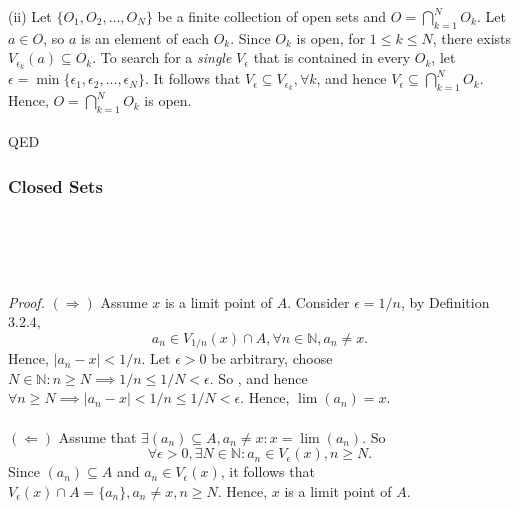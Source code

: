 \documentclass{article}
\begin{document}
            (ii) Let $\{O_1, O_2, \dots, O_N\}$ be a finite collection of open sets and $O = \bigcap_{k=1}^N O_k$. Let $a \in O$, so $a$ is an element of each $O_k$. Since $O_k$ is open, for $1 \leq k \leq N$, there exists $V_{\epsilon_k}(a) \subseteq O_k$. To search for a \textit{single} $V_\epsilon$ that is contained in every $O_k$, let $\epsilon = \min\{\epsilon_1,\epsilon_2,\dots,\epsilon_N\}$. It follows that $V_\epsilon \subseteq V_{\epsilon_k}, \forall k$, and hence $V_\epsilon \subseteq \bigcap_{k=1}^N O_k$. Hence, $O = \bigcap_{k=1}^N O_k$ is open.\\ \\
            QED
            \subsubsection{Closed Sets}
            \\ \\
            \\ \\
            \textit{Proof.} $(\Rightarrow)$ Assume $x$ is a limit point of $A$. Consider $\epsilon = 1/n$, by Definition 3.2.4,
            \begin{equation*}
                a_n \in V_{1/n}(x) \cap A, \forall n \in \mathbb{N}, a_n \neq x.
            \end{equation*}
            Hence, $|a_n - x| < 1/n$. Let $\epsilon > 0$ be arbitrary, choose $N \in \mathbb{N}: n \geq N \implies 1/n \leq 1/N < \epsilon$. So , and hence $\forall n \geq N \implies |a_n - x| < 1/n \leq 1/N < \epsilon$. Hence, $\lim(a_n) = x$.
            \\ \\
            $(\Leftarrow)$ Assume that $\exists (a_n) \subseteq A, a_n \neq x: x=\lim(a_n)$. So 
            \begin{equation*}
                \forall \epsilon > 0, \exists N \in \mathbb{N}: a_n \in V_\epsilon(x), n \geq N.
            \end{equation*}
            Since $(a_n) \subseteq A$ and $a_n \in V_\epsilon(x)$, it follows that $V_\epsilon(x) \cap A = \{a_n\}, a_n \neq x, n \geq N$. Hence, $x$ is a limit point of $A$.\\ \\
\end{document}
